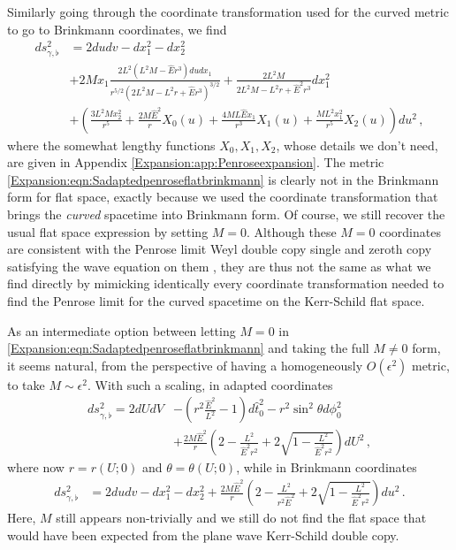 Similarly going through the coordinate transformation used for the curved metric to go to Brinkmann coordinates, we find
\begin{equation}\label{Expansion:eqn:Sadaptedpenroseflatbrinkmann}
\begin{aligned}
ds^2_{\gamma,\flat} &=  
2 du dv -dx^2_1 - dx_2^2\, \\
&+ 2 M x_1  \frac{2 L^2 (L^2 M - \hat{E}r^3) du dx_1}{r^{5/2} \left(2 L^2 M -L^2 r + \hat{E} r^3 \right)^{3/2}}  + \frac{2L^2 M}{2 L^2 M -L^2 r + \hat{E}^2 r^3} dx_1^2 \\
&+ \left( \frac{3 L^2 M x_2^2}{r^5} + \frac{2M \hat{E}^2}{r} X_0(u) + \frac{4 M L \hat{E} x_1}{r^3} X_1(u) + \frac{M L^2 x_1^2}{r^5} X_2(u) \right)du^2 \, ,
\end{aligned}
\end{equation}
where the somewhat lengthy functions $X_0, X_1, X_2$, whose details we don't need, are given in  Appendix \ref{Expansion:app:Penroseexpansion}. The metric \eqref{Expansion:eqn:Sadaptedpenroseflatbrinkmann} is clearly not in the Brinkmann form for flat space, exactly because we used the coordinate transformation that brings the \emph{curved} spacetime into Brinkmann form. Of course, we still recover the usual flat space expression by setting $M = 0$. Although these $M = 0$ coordinates are consistent with the Penrose limit Weyl double copy single and zeroth copy satisfying the wave equation on them \cite{Chawla:2024mse}, they are thus not the same as what we find directly by mimicking identically every coordinate transformation needed to find the Penrose limit for the curved spacetime on the Kerr-Schild flat space.

As an intermediate option between letting $M = 0$ in \eqref{Expansion:eqn:Sadaptedpenroseflatbrinkmann} and taking the full $M \neq 0$ form, it seems natural, from the perspective of having a homogeneously $O(\epsilon^2)$ metric, to take $M \sim \epsilon^2$. With such a scaling, in adapted coordinates
\begin{equation}\label{Expansion:eqn:Sadaptedpenroseflatscaling}
\begin{aligned}
ds^2_{\gamma,\flat} =  
2 dU dV&- \left(r^2 \frac{\hat{E}^2}{L^2}-1\right)d\hat{t}_0^2 - r^2 \sin^2 \theta d \phi_0^2 \\  &+ \frac{2M \hat{E}^2}{r}  \left(2-\frac{L^2}{\hat{E}^2 r^2}+2\sqrt{1-\frac{L^2}{\hat{E}^2 r^2}}\right) dU^2 \, ,
\end{aligned}
\end{equation}
where now $r = r(U;0)$ and $\theta = \theta(U;0)$, while in Brinkmann coordinates
\begin{equation}\label{Expansion:eqn:Sadaptedpenroseflatbrinkmannscaling}
\begin{aligned}
ds^2_{\gamma,\flat} &=  
2 du dv -dx^2_1 - dx_2^2 + \frac{2M \hat{E}^2}{r} \left(2- \frac{L^2}{r^2 \hat{E}^2} +2\sqrt{1-\frac{L^2}{\hat{E}^2 r^2}}\right) du^2 \, .
\end{aligned}
\end{equation}
Here, $M$ still appears non-trivially and we still do not find the flat space that would have been expected from the plane wave Kerr-Schild double copy. 

